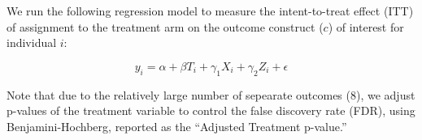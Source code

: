 \documentclass{article}
\begin{document}
We run the following regression model to measure the intent-to-treat effect (ITT) of assignment to the treatment arm on the outcome construct ($c$) of interest for individual $i$:

$$
y_{i} = \alpha + \beta T_{i} + \gamma_1X_{i} + \gamma_2Z_i + \epsilon
$$

Note that due to the relatively large number of sepearate outcomes (8), we adjust p-values of the treatment variable to control the false discovery rate (FDR), using Benjamini-Hochberg, reported as the ``Adjusted Treatment p-value.''




% 
% 
% 

% 
% 
% 









% 
% 
% 

% 
% 
% 
\end{document}

